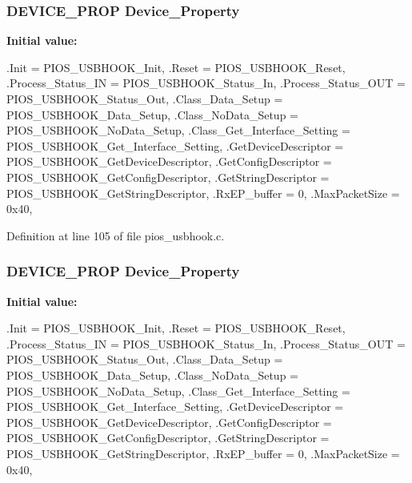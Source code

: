 \hypertarget{group___p_i_o_s___u_s_b_h_o_o_k_ga646bdfc60e69ee637f2c39b5bb91dfec}{
\subsubsection[{\-Device\-\_\-\-Property}]{\setlength{\rightskip}{0pt plus 5cm}\-D\-E\-V\-I\-C\-E\-\_\-\-P\-R\-O\-P {\bf \-Device\-\_\-\-Property}}}\label{group___p_i_o_s___u_s_b_h_o_o_k_ga646bdfc60e69ee637f2c39b5bb91dfec}
{\bfseries \-Initial value\-:}
\begin{DoxyCode}
 {
        .Init                        = PIOS_USBHOOK_Init,
        .Reset                       = PIOS_USBHOOK_Reset,
        .Process_Status_IN           = PIOS_USBHOOK_Status_In,
        .Process_Status_OUT          = PIOS_USBHOOK_Status_Out,
        .Class_Data_Setup            = PIOS_USBHOOK_Data_Setup,
        .Class_NoData_Setup          = PIOS_USBHOOK_NoData_Setup,
        .Class_Get_Interface_Setting = PIOS_USBHOOK_Get_Interface_Setting,
        .GetDeviceDescriptor         = PIOS_USBHOOK_GetDeviceDescriptor,
        .GetConfigDescriptor         = PIOS_USBHOOK_GetConfigDescriptor,
        .GetStringDescriptor         = PIOS_USBHOOK_GetStringDescriptor,
        .RxEP_buffer                 = 0,
        .MaxPacketSize               = 0x40,
}
\end{DoxyCode}


\-Definition at line 105 of file pios\-\_\-usbhook.\-c.

\hypertarget{group___p_i_o_s___u_s_b_h_o_o_k_ga646bdfc60e69ee637f2c39b5bb91dfec}{
\subsubsection[{\-Device\-\_\-\-Property}]{\setlength{\rightskip}{0pt plus 5cm}\-D\-E\-V\-I\-C\-E\-\_\-\-P\-R\-O\-P {\bf \-Device\-\_\-\-Property}}}\label{group___p_i_o_s___u_s_b_h_o_o_k_ga646bdfc60e69ee637f2c39b5bb91dfec}
{\bfseries \-Initial value\-:}
\begin{DoxyCode}
 {
        .Init                        = PIOS_USBHOOK_Init,
        .Reset                       = PIOS_USBHOOK_Reset,
        .Process_Status_IN           = PIOS_USBHOOK_Status_In,
        .Process_Status_OUT          = PIOS_USBHOOK_Status_Out,
        .Class_Data_Setup            = PIOS_USBHOOK_Data_Setup,
        .Class_NoData_Setup          = PIOS_USBHOOK_NoData_Setup,
        .Class_Get_Interface_Setting = PIOS_USBHOOK_Get_Interface_Setting,
        .GetDeviceDescriptor         = PIOS_USBHOOK_GetDeviceDescriptor,
        .GetConfigDescriptor         = PIOS_USBHOOK_GetConfigDescriptor,
        .GetStringDescriptor         = PIOS_USBHOOK_GetStringDescriptor,
        .RxEP_buffer                 = 0,
        .MaxPacketSize               = 0x40,
}
\end{DoxyCode}


